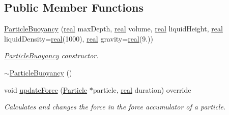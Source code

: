 \subsection*{Public Member Functions}
\begin{DoxyCompactItemize}
\item 
\mbox{\hyperlink{classr3_1_1_particle_buoyancy_a32db81f5aba8e5d2a6990c56074e1557}{Particle\+Buoyancy}} (\mbox{\hyperlink{namespacer3_ab2016b3e3f743fb735afce242f0dc1eb}{real}} max\+Depth, \mbox{\hyperlink{namespacer3_ab2016b3e3f743fb735afce242f0dc1eb}{real}} volume, \mbox{\hyperlink{namespacer3_ab2016b3e3f743fb735afce242f0dc1eb}{real}} liquid\+Height, \mbox{\hyperlink{namespacer3_ab2016b3e3f743fb735afce242f0dc1eb}{real}} liquid\+Density=\mbox{\hyperlink{namespacer3_ab2016b3e3f743fb735afce242f0dc1eb}{real}}(1000), \mbox{\hyperlink{namespacer3_ab2016b3e3f743fb735afce242f0dc1eb}{real}} gravity=\mbox{\hyperlink{namespacer3_ab2016b3e3f743fb735afce242f0dc1eb}{real}}(9.))
\begin{DoxyCompactList}\small\item\em \mbox{\hyperlink{classr3_1_1_particle_buoyancy}{Particle\+Buoyancy}} constructor. \end{DoxyCompactList}\item 
\mbox{\hyperlink{classr3_1_1_particle_buoyancy_a9ebaf421f758cf01ce164f679cb5c4c0}{$\sim$\+Particle\+Buoyancy}} ()
\item 
void \mbox{\hyperlink{classr3_1_1_particle_buoyancy_ad1249e51508770fd9b1775c8e22eb51a}{update\+Force}} (\mbox{\hyperlink{classr3_1_1_particle}{Particle}} $\ast$particle, \mbox{\hyperlink{namespacer3_ab2016b3e3f743fb735afce242f0dc1eb}{real}} duration) override
\begin{DoxyCompactList}\small\item\em Calculates and changes the force in the force accumulator of a particle. \end{DoxyCompactList}\end{DoxyCompactItemize}
